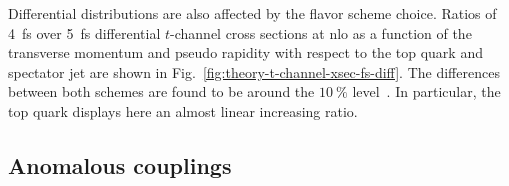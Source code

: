 Differential distributions are also affected by the flavor scheme choice. Ratios of 4~\gls{fs} over 5~\gls{fs} differential $t$-channel cross sections at \gls{nlo} as a function of the transverse momentum and pseudo rapidity with respect to the top quark and spectator jet are shown in Fig.~\ref{fig:theory-t-channel-xsec-fs-diff}. The differences between both schemes are found to be around the $10~\%$ level~\cite{Campbell:2009ss}. In particular, the top quark \pt displays here an almost linear increasing ratio.



\subsection{Anomalous couplings}

